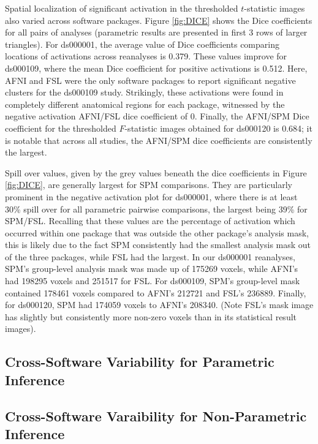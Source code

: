 Spatial localization of significant activation in the thresholded $t$-statistic images also varied across software packages. Figure \ref{fig:DICE} shows the Dice coefficients for all pairs of analyses (parametric results are presented in first 3 rows of larger triangles). For ds000001, the average value of Dice coefficients comparing locations of activations across reanalyses is 0.379. These values improve for ds000109, where the mean Dice coefficient for positive activations is 0.512. Here, AFNI and FSL were the only software packages to report significant negative clusters for the ds000109 study. Strikingly, these activations were found in completely different anatomical regions for each package, witnessed by the negative activation AFNI/FSL dice coefficient of 0. Finally, the AFNI/SPM Dice coefficient for the thresholded $F$-statistic images obtained for ds000120 is 0.684; it is notable that across all studies, the AFNI/SPM dice coefficients are consistently the largest.

Spill over values, given by the grey values beneath the dice coefficients in Figure \ref{fig:DICE}, are generally largest for SPM comparisons. They are particularly prominent in the negative activation plot for ds000001, where there is at least 30\% spill over for all parametric pairwise comparisons, the largest being 39\% for SPM/FSL. Recalling that these values are the percentage of activation which occurred within one package that was outside the other package's analysis mask, this is likely due to the fact SPM consistently had the smallest analysis mask out of the three packages, while FSL had the largest. In our ds000001 reanalyses, SPM's group-level analysis mask was made up of 175269 voxels, while AFNI's had 198295 voxels and 251517 for FSL.  For ds000109, SPM's group-level mask contained 178461 voxels compared to AFNI's 212721 and FSL's 236889. Finally, for ds000120, SPM had 174059 voxels to AFNI's 208340. (Note FSL's mask image has slightly but consistently more non-zero voxels than in its statistical result images).

\subsection{Cross-Software Variability for Parametric Inference}

\subsection{Cross-Software Varaibility for Non-Parametric Inference}

